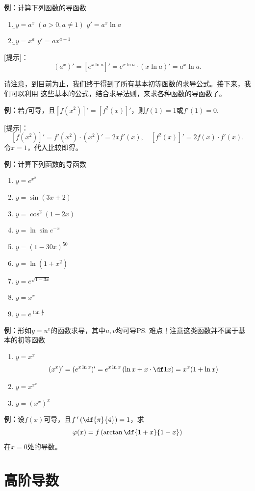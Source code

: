 {\bf 例：}计算下列函数的导函数
\begin{enumerate}[(1)]
  \setlength{\itemindent}{1cm}
  \item {\b$y=a^x\;(a>0,a\ne 1)$ \hfill $y'=a^x\ln a$} 
  \item {\b$y=x^a$ \hfill $y'=ax^{a-1}$}
\end{enumerate}

[提示]：
$$(a^x)'=[e^{x\ln a}]'=e^{x\ln a}\cdot (x\ln a)'=a^x\ln a.$$

请注意，到目前为止，我们终于得到了所有基本初等函数的求导公式。接下来，我们可以利用
这些基本的公式，结合求导法则，来求各种函数的导函数了。

{\bf 例：}若$f$可导，且$[f(x^2)]'=[f^2(x)]'$，则$f(1)=1$或$f'(1)=0$.

[提示]：
$$[f(x^2)]'=f'(x^2)\cdot (x^2)'=2xf'(x),
\quad [f^2(x)]'=2f(x)\cdot f'(x).$$
令$x=1$，代入比较即得。

{\bf 例：}计算下列函数的导函数
\begin{enumerate}[(1)]
  \setlength{\itemindent}{1cm}
  \item $y=e^{x^2}$ 
  \item $y=\sin (3x+2)$ 
  \item $y=\cos^2(1-2x)$ 
  \item $y=\ln\sin e^{-x}$ 
  \item $y=(1-30x)^{50}$ 
  \item $y=\ln(1+x^2)$ 
  \item $y=e^{\sqrt{1-3x}}$ 
  \item $y=x^x$ 
  \item $y=e^{\tan\frac 1x}$
\end{enumerate}

{\b{\bf 例：}形如$y=u^v$的函数求导，其中$u,v$均可导\ps{难点！注意这类函数并不属于基本的初等函数}
\begin{enumerate}[(1)]
  \setlength{\itemindent}{1cm}
  \item $y=x^x$
  $$(x^x)'=(e^{x\ln x})'=e^{x\ln x}\left(\ln x+x\cdot\df1x\right)=x^x(1+\ln x)$$
  \item $y=x^{x^x}$
  \item $y=\left(x^x\right)^x$
\end{enumerate}
}

{\bf 例：}设$f(x)$可导，且$f\,'\left(\df{\pi}{4}\right)=1$，求
$$\varphi(x)=f\left(\arctan\df{1+x}{1-x}\right)$$
在$x=0$处的导数。

\section{高阶导数}

